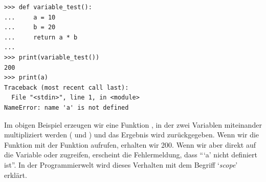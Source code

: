 \begin{Verbatim}[frame=single]
>>> def variable_test():
...     a = 10
...     b = 20
...     return a * b
...
>>> print(variable_test())
200
>>> print(a)
Traceback (most recent call last):
  File "<stdin>", line 1, in <module>
NameError: name 'a' is not defined
\end{Verbatim}

Im obigen Beispiel erzeugen wir eine Funktion , in der zwei Variablen miteinander multipliziert werden ( und ) und das Ergebnis wird zurückgegeben. Wenn wir die Funktion mit der  Funktion aufrufen, erhalten wir 200. Wenn wir aber direkt auf die Variable  oder  zugreifen, erscheint die Fehlermeldung, dass ```a' nicht definiert ist''. In der Programmierwelt wird dieses Verhalten mit dem Begriff `\emph{scope}' erklärt. 
\par
